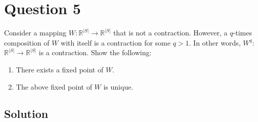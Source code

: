 \section*{Question 5}

Consider a mapping \( W: \mathbb{R}^{|S|} \rightarrow \mathbb{R}^{|S|} \) that is not a contraction.
However, a \( q \)-times composition of \( W \) with itself is a contraction for some \( q>1 \).
In other words, \( W^{q} \): \( \mathbb{R}^{|S|} \rightarrow \mathbb{R}^{|S|} \) is a contraction.
Show the following:
\begin{enumerate}[noitemsep]
    \item There exists a fixed point of \( W \).
    \item The above fixed point of \( W \) is unique.
\end{enumerate}

\subsection*{Solution}

